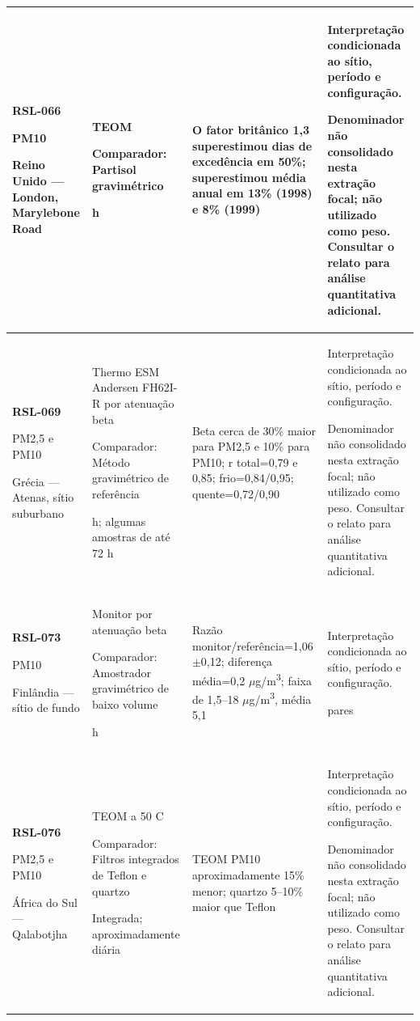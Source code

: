 \begin{longtable}{|P{0.18\textwidth}|P{0.25\textwidth}|P{0.28\textwidth}|P{\arrayrulewidth\relax}|}
\textbf{RSL-066}\par\textcite{rsl066}\par PM10\par Reino Unido --- London, Marylebone Road & TEOM\par\medskip Comparador: Partisol gravimétrico\par{} h & O fator britânico 1,3 superestimou dias de excedência em 50\%; superestimou média anual em 13\% (1998) e 8\% (1999) & Interpretação condicionada ao sítio, período e configuração.\par\medskip Denominador não consolidado nesta extração focal; não utilizado como peso. Consultar o relato para análise quantitativa adicional.\\\hline
\textbf{RSL-069}\par\textcite{rsl069}\par PM2,5 e PM10\par Grécia --- Atenas, sítio suburbano & Thermo ESM Andersen FH62I-R por atenuação beta\par\medskip Comparador: Método gravimétrico de referência\par{} h; algumas amostras de até 72 h & Beta cerca de 30\% maior para PM2,5 e 10\% para PM10; r total=0,79 e 0,85; frio=0,84/0,95; quente=0,72/0,90 & Interpretação condicionada ao sítio, período e configuração.\par\medskip Denominador não consolidado nesta extração focal; não utilizado como peso. Consultar o relato para análise quantitativa adicional.\\\hline
\textbf{RSL-073}\par\textcite{rsl073}\par PM10\par Finlândia --- sítio de fundo & Monitor por atenuação beta\par\medskip Comparador: Amostrador gravimétrico de baixo volume\par{} h & Razão monitor/referência=1,06\ensuremath{\pm}0,12; diferença média=0,2 \ensuremath{\mu}g/m\textsuperscript{3}; faixa de 1,5--18 \ensuremath{\mu}g/m\textsuperscript{3}, média 5,1 & Interpretação condicionada ao sítio, período e configuração.\par{} pares\\\hline
\textbf{RSL-076}\par\textcite{rsl076}\par PM2,5 e PM10\par África do Sul --- Qalabotjha & TEOM a 50 \textdegree{}C\par\medskip Comparador: Filtros integrados de Teflon e quartzo\par\medskip Integrada; aproximadamente diária & TEOM PM10 aproximadamente 15\% menor; quartzo 5--10\% maior que Teflon & Interpretação condicionada ao sítio, período e configuração.\par\medskip Denominador não consolidado nesta extração focal; não utilizado como peso. Consultar o relato para análise quantitativa adicional.\\\hline

\end{longtable}
